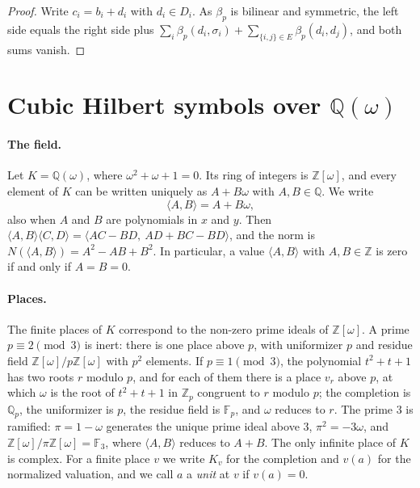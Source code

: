 \documentclass[11pt]{article}
\newcommand{\Z}{\mathbb{Z}}
\newcommand{\Q}{\mathbb{Q}}
\newcommand{\F}{\mathbb{F}}
\begin{document}
\begin{proof}
Write $c_i=b_i+d_i$ with $d_i\in D_i$. As $\beta_p$ is bilinear and symmetric, the left side equals the right side plus $\sum_i\beta_p(d_i,\sigma_i)+\sum_{\{i,j\}\in E}\beta_p(d_i,d_j)$, and both sums vanish.
\end{proof}



\section{\texorpdfstring{Cubic Hilbert symbols over $\Q(\omega)$}{Cubic Hilbert symbols over Q(w)}}\label{sec:csymbols}

\paragraph{The field.} Let $K=\Q(\omega)$, where $\omega^2+\omega+1=0$. Its ring of integers is $\Z[\omega]$, and every element of $K$ can be written uniquely as $A+B\omega$ with $A,B\in\Q$. We write
\[
\langle A,B\rangle=A+B\omega,
\]
also when $A$ and $B$ are polynomials in $x$ and $y$. Then $\langle A,B\rangle\langle C,D\rangle=\langle AC-BD,\ AD+BC-BD\rangle$, and the norm is $N(\langle A,B\rangle)=A^2-AB+B^2$. In particular, a value $\langle A,B\rangle$ with $A,B\in\Z$ is zero if and only if $A=B=0$.

\paragraph{Places.} The finite places of $K$ correspond to the non-zero prime ideals of $\Z[\omega]$. A prime $p\equiv2\pmod3$ is inert: there is one place above $p$, with uniformizer $p$ and residue field $\Z[\omega]/p\Z[\omega]$ with $p^2$ elements. If $p\equiv1\pmod3$, the polynomial $t^2+t+1$ has two roots $r$ modulo $p$, and for each of them there is a place $v_r$ above $p$, at which $\omega$ is the root of $t^2+t+1$ in $\Z_p$ congruent to $r$ modulo $p$; the completion is $\Q_p$, the uniformizer is $p$, the residue field is $\F_p$, and $\omega$ reduces to $r$. The prime $3$ is ramified: $\pi=1-\omega$ generates the unique prime ideal above $3$, $\pi^2=-3\omega$, and $\Z[\omega]/\pi\Z[\omega]=\F_3$, where $\langle A,B\rangle$ reduces to $A+B$. The only infinite place of $K$ is complex. For a finite place $v$ we write $K_v$ for the completion and $v(a)$ for the normalized valuation, and we call $a$ a \emph{unit} at $v$ if $v(a)=0$.
\end{document}
